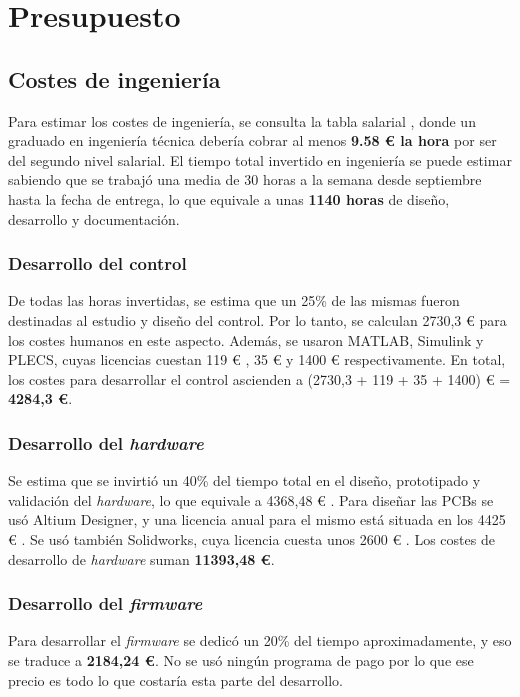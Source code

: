 \newpage
\section{Presupuesto}
\subsection{Costes de ingeniería}

Para estimar los costes de ingeniería, se consulta la tabla salarial \cite{SEGSOC2024}, donde un graduado en ingeniería técnica debería cobrar al menos \textbf{9.58 \euro{}  la hora} por ser del segundo nivel salarial. El tiempo total invertido en ingeniería se puede estimar sabiendo que se trabajó una media de 30 horas a la semana desde septiembre hasta la fecha de entrega, lo que equivale a unas \textbf{1140 horas} de diseño, desarrollo y documentación.

\subsubsection{Desarrollo del control}
De todas las horas invertidas, se estima que un 25\% de las mismas fueron destinadas al estudio y diseño del control. Por lo tanto, se calculan 2730,3 \euro{} para los costes humanos en este aspecto. Además, se usaron MATLAB, Simulink y PLECS, cuyas licencias cuestan 119 \euro{} \cite{MathWorks2024}, 35 \euro{} \cite{MathWorks2024} y 1400 \euro{} \cite{Plexim2024} respectivamente. En total, los costes para desarrollar el control ascienden a (2730,3 + 119 + 35 + 1400) \euro{}  = \textbf{4284,3 \euro{}}.

\subsubsection{Desarrollo del \textit{hardware}}
Se estima que se invirtió un 40\% del tiempo total en el diseño, prototipado y validación del \textit{hardware}, lo que equivale a 4368,48 \euro{} . Para diseñar las PCBs se usó Altium Designer, y una licencia anual para el mismo está situada en los 4425 \euro{} \cite{Altium2024}. Se usó también Solidworks, cuya licencia cuesta unos 2600 \euro{} \cite{GoEngineer2024}. Los costes de desarrollo de \textit{hardware} suman \textbf{11393,48 \euro{}}.

\subsubsection{Desarrollo del \textit{firmware}}
Para desarrollar el \textit{firmware} se dedicó un 20\% del tiempo aproximadamente, y eso se traduce a \textbf{2184,24 \euro{}}. No se usó ningún programa de pago por lo que ese precio es todo lo que costaría esta parte del desarrollo.

